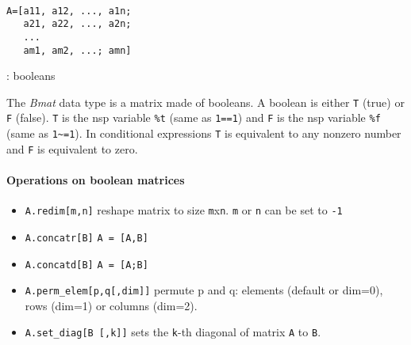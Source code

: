 
\begin{mandesc}
   \\
\end{mandesc}
\begin{calling_sequence}
\begin{verbatim}
A=[a11, a12, ..., a1n;
   a21, a22, ..., a2n;
   ...
   am1, am2, ...; amn]
\end{verbatim}
\end{calling_sequence}
\begin{parameters}
  \begin{varlist}
    : booleans
  \end{varlist}
\end{parameters}

\begin{mandescription}
The \emph{Bmat} data type is a matrix made of booleans. 
A boolean is either \verb+T+ (true) or \verb+F+ (false). 
\verb+T+ is the nsp variable \verb+%t+ (same as \verb+1==1+)
and \verb+F+ is the nsp variable \verb+%f+ (same as \verb+1~=1+).
In conditional expressions \verb+T+ is equivalent to any nonzero
number and \verb+F+ is equivalent to zero.
\end{mandescription}

\paragraph{Operations on boolean matrices}
\begin{itemize}
\item \verb+A.redim[m,n]+ reshape matrix to size \verb+m+x\verb+n+. \verb+m+ or \verb+n+ can be set to \verb+-1+
\item \verb+A.concatr[B]+ \verb+A = [A,B]+
\item \verb+A.concatd[B]+ \verb+A = [A;B]+
\item \verb+A.perm_elem[p,q[,dim]]+ permute p and q: elements
  (default or dim=0), rows (dim=1) or columns (dim=2).
\item \verb+A.set_diag[B [,k]]+ sets the \verb+k+-th diagonal of matrix \verb+A+ to \verb+B+.
\end{itemize}

